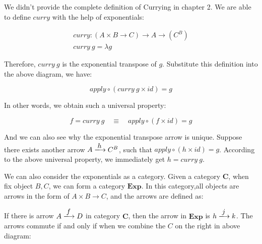 \documentclass{article}
\begin{document}

We didn't provide the complete definition of Currying in chapter 2. We are able to define $curry$ with the help of exponentials:

\[
\begin{array}{l}
curry : (A \times B \to C) \to A \to (C^B) \\
curry\ g = \lambda g
\end{array}
\]

Therefore, $curry\ g$ is the exponential transpose of $g$. Substitute this definition into the above diagram, we have:

\[
  apply \circ (curry\ g \times id) = g
\]

In other words, we obtain such a universal property:

\[
  f = curry\ g \quad \equiv \quad apply \circ (f \times id) = g
\]

And we can also see why the exponential transpose arrow is unique. Suppose there exists another arrow $A \arrowto{h} C^B$, such that $apply \circ (h \times id) = g$. According to the above universal property, we immediately get $h = curry\ g$.

We can also consider the exponentials as a category. Given a category $\pmb{C}$, when fix object $B, C$, we can form a category $\pmb{Exp}$. In this category,all objects are arrows in the form of $A \times B \to C$, and the arrows are defined as:

\begin{center}
\end{center}

If there is arrow $A \arrowto{f} D$ in category $\pmb{C}$, then the arrow in $\pmb{Exp}$ is $h \arrowto{j} k$. The arrows commute if and only if when we combine the $C$ on the right in above diagram:

\begin{center}
\end{center}
\end{document}
